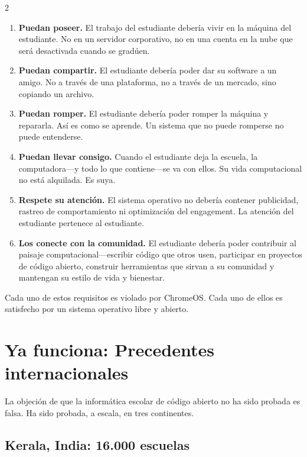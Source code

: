 \documentclass[11pt, a4paper]{article}
\begin{document}
\begin{multicols}{2}
\begin{enumerate}
  \item \textbf{Puedan poseer.} El trabajo del estudiante debería vivir en la máquina del estudiante. No en un servidor corporativo, no en una cuenta en la nube que será desactivada cuando se gradúen.

  \item \textbf{Puedan compartir.} El estudiante debería poder dar su software a un amigo. No a través de una plataforma, no a través de un mercado, sino copiando un archivo.

  \item \textbf{Puedan romper.} El estudiante debería poder romper la máquina y repararla. Así es como se aprende. Un sistema que no puede romperse no puede entenderse.

  \item \textbf{Puedan llevar consigo.} Cuando el estudiante deja la escuela, la computadora---y todo lo que contiene---se va con ellos. Su vida computacional no está alquilada. Es suya.

  \item \textbf{Respete su atención.} El sistema operativo no debería contener publicidad, rastreo de comportamiento ni optimización del engagement. La atención del estudiante pertenece al estudiante.

  \item \textbf{Los conecte con la comunidad.} El estudiante debería poder contribuir al paisaje computacional---escribir código que otros usen, participar en proyectos de código abierto, construir herramientas que sirvan a su comunidad y mantengan su estilo de vida y bienestar.
\end{enumerate}

Cada uno de estos requisitos es violado por ChromeOS. Cada uno de ellos es satisfecho por un sistema operativo libre y abierto.


\section{Ya funciona: Precedentes internacionales}

La objeción de que la informática escolar de código abierto no ha sido probada es falsa. Ha sido probada, a escala, en tres continentes.

\subsection{Kerala, India: 16.000 escuelas}


\end{multicols}
\end{document}
